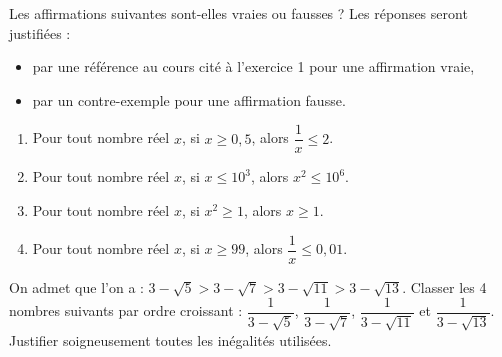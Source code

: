 \documentclass[a4paper,11pt,DIV15,BCOR0mm]{scrartcl}
\begin{document}
\begin{exercice}
 Les affirmations suivantes sont-elles vraies ou fausses ? Les réponses seront justifiées :
\begin{itemize}
 \item par une référence au cours cité à l'exercice 1 pour une affirmation vraie,
 \item par un contre-exemple pour une affirmation fausse.
\end{itemize}
\begin{enumerate}
 \item Pour tout nombre réel $x$, si $x\geq 0,5$, alors $\dfrac{1}{x}\leq 2$.
 \item Pour tout nombre réel $x$, si $x\leq 10^3$, alors $x^2\leq 10^6$.
 \item Pour tout nombre réel $x$, si $x^2\geq 1$, alors $x\geq 1$.
 \item Pour tout nombre réel $x$, si $x\geq 99$, alors $\dfrac{1}{x}\leq0,01$.
\end{enumerate}

\end{exercice}

\begin{exercice}
On admet que l'on a : $3-\sqrt{5}>3-\sqrt{7}>3-\sqrt{11}>3-\sqrt{13}$.
Classer les 4 nombres suivants par ordre croissant : $\dfrac{1}{3-\sqrt{5}}$,
$\dfrac{1}{3-\sqrt{7}}$, $\dfrac{1}{3-\sqrt{11}}$ et $\dfrac{1}{3-\sqrt{13}}$.
Justifier soigneusement toutes les inégalités utilisées.
\end{exercice}
\end{document}
